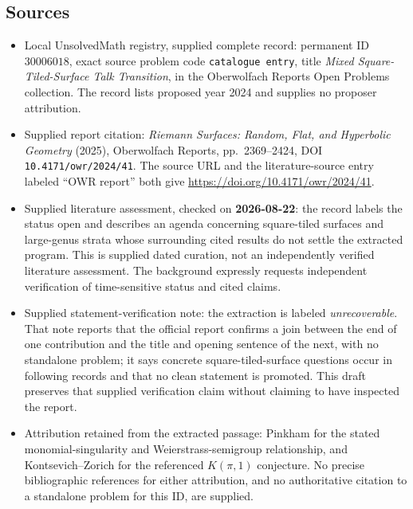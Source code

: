 \documentclass[11pt]{article}
\begin{document}
\subsection{Sources}
\begin{itemize}
\item Local UnsolvedMath registry, supplied complete record: permanent ID \(30006018\), exact source problem code \texttt{catalogue entry}, title \emph{Mixed Square-Tiled-Surface Talk Transition}, in the Oberwolfach Reports Open Problems collection. The record lists proposed year 2024 and supplies no proposer attribution.
\item Supplied report citation: \emph{Riemann Surfaces: Random, Flat, and Hyperbolic Geometry} (2025), Oberwolfach Reports, pp.~2369--2424, DOI \texttt{10.4171/owr/2024/41}. The source URL and the literature-source entry labeled ``OWR report'' both give \url{https://doi.org/10.4171/owr/2024/41}.
\item Supplied literature assessment, checked on \textbf{2026-08-22}: the record labels the status open and describes an agenda concerning square-tiled surfaces and large-genus strata whose surrounding cited results do not settle the extracted program. This is supplied dated curation, not an independently verified literature assessment. The background expressly requests independent verification of time-sensitive status and cited claims.
\item Supplied statement-verification note: the extraction is labeled \emph{unrecoverable}. That note reports that the official report confirms a join between the end of one contribution and the title and opening sentence of the next, with no standalone problem; it says concrete square-tiled-surface questions occur in following records and that no clean statement is promoted. This draft preserves that supplied verification claim without claiming to have inspected the report.
\item Attribution retained from the extracted passage: Pinkham for the stated monomial-singularity and Weierstrass-semigroup relationship, and Kontsevich--Zorich for the referenced \(K(\pi,1)\) conjecture. No precise bibliographic references for either attribution, and no authoritative citation to a standalone problem for this ID, are supplied.
\end{itemize}
\end{document}
